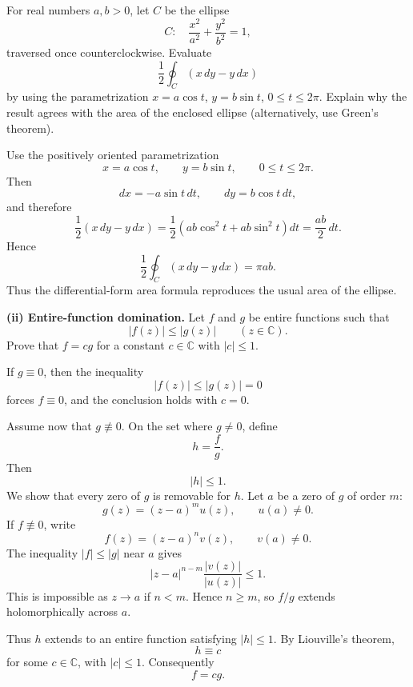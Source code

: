 \begin{problem}[CP-IV-0003]
\label{prob:cp-iv-0003}
For real numbers $a,b>0$, let $C$ be the ellipse
\[
C:\quad \frac{x^{2}}{a^{2}}+\frac{y^{2}}{b^{2}}=1,
\]
traversed once counterclockwise. Evaluate
\[
\frac12\oint_C(x\,dy-y\,dx)
\]
by using the parametrization $x=a\cos t$, $y=b\sin t$,
$0\le t\le2\pi$. Explain why the result agrees with the area
of the enclosed ellipse (alternatively, use Green's theorem).
\end{problem}

\begin{solution}
Use the positively oriented parametrization
\[
x=a\cos t,\qquad
y=b\sin t,
\qquad
0\le t\le2\pi.
\]
Then
\[
dx=-a\sin t\,dt,
\qquad
dy=b\cos t\,dt,
\]
and therefore
\[
\frac12(x\,dy-y\,dx)
=
\frac12
\left(
ab\cos^2t+ab\sin^2t
\right)dt
=
\frac{ab}{2}\,dt.
\]
Hence
\[
\boxed{
\frac12\oint_C(x\,dy-y\,dx)=\pi ab.
}
\]
Thus the differential-form area formula reproduces the usual area of the ellipse.
\end{solution}


\begin{problem}[CP-IV-0006]
\label{prob:cp-iv-0006}
\par\noindent\textbf{(ii) Entire-function domination.}\quad
Let $f$ and $g$ be entire functions such that
\[
|f(z)|\le |g(z)|\qquad(z\in\mathbb C).
\]
Prove that $f=cg$ for a constant $c\in\mathbb C$ with $|c|\le1$.
\end{problem}

\begin{solution}
If \(g\equiv0\), then the inequality
\[
|f(z)|\le|g(z)|=0
\]
forces \(f\equiv0\), and the conclusion holds with \(c=0\).

Assume now that \(g\not\equiv0\). On the set where \(g\neq0\), define
\[
h=\frac{f}{g}.
\]
Then
\[
|h|\le1.
\]
We show that every zero of \(g\) is removable for \(h\). Let \(a\) be a zero of \(g\) of order \(m\):
\[
g(z)=(z-a)^m u(z),
\qquad
u(a)\neq0.
\]
If \(f\not\equiv0\), write
\[
f(z)=(z-a)^n v(z),
\qquad
v(a)\neq0.
\]
The inequality \(|f|\le|g|\) near \(a\) gives
\[
|z-a|^{n-m}\frac{|v(z)|}{|u(z)|}\le1.
\]
This is impossible as \(z\to a\) if \(n<m\). Hence \(n\ge m\), so \(f/g\) extends holomorphically across \(a\).

Thus \(h\) extends to an entire function satisfying \(|h|\le1\). By Liouville's theorem,
\[
h\equiv c
\]
for some \(c\in\mathbb C\), with \(|c|\le1\). Consequently
\[
\boxed{f=cg}.
\]
\end{solution}


